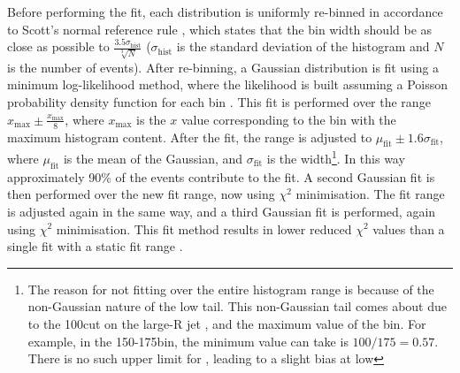 Before performing the fit, each \ptref distribution is uniformly re-binned in accordance to Scott's normal reference rule \cite{Insitu:scottsrule}, which states that the bin width should be as close as possible to $\frac{3.5\sigma_{\text{hist}}}{\sqrt[3]{N}}$ ($\sigma_{\text{hist}}$ is the standard deviation of the histogram and $N$ is the number of events). After re-binning, a Gaussian distribution is fit using a minimum log-likelihood method, where the likelihood is built assuming a Poisson probability density function for each bin \cite{Insitu:likelihoodfit}. This fit is performed over the range $x_{\text{max}}\pm\frac{x_{\text{max}}}{8}$, where $x_{\text{max}}$ is the $x$ value corresponding to the bin with the maximum histogram content. After the fit, the range is adjusted to $\mu_{\text{fit}}\pm1.6\sigma_{\text{fit}}$, where $\mu_{\text{fit}}$ is the mean of the Gaussian, and $\sigma_{\text{fit}}$ is the width\footnote{The reason for not fitting over the entire histogram range is because of the non-Gaussian nature of the low \ptbal tail. This non-Gaussian tail comes about due to the 100\GeV cut on the large-R jet \pt, and the maximum value of the \ptref bin. For example, in the 150-175\GeV bin, the minimum value \ptbal can take is $100/175=0.57$. There is no such upper limit for \ptref, leading to a slight bias at low \ptref}. In this way approximately 90\% of the events contribute to the fit. A second Gaussian fit is then performed over the new fit range, now using $\chi^2$ minimisation. The fit range is adjusted again in the same way, and a third Gaussian fit is performed, again using $\chi^2$ minimisation. This fit method results in lower reduced $\chi^2$ values than a single fit with a static fit range \cite{Insitu:JetResponseFitter}.

